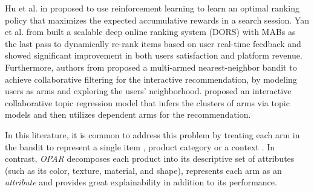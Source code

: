 \documentclass[11pt, dvipdfmx]{article}
\begin{document}
Hu et al. in \cite{KDD18_TaobaoSearch_RL} proposed to use reinforcement learning to learn an optimal ranking policy that maximizes the expected accumulative rewards in a search session. 
Yan et al. from \cite{MLKD19_JD_onlineRanking} built a scalable deep online ranking system (DORS) with MABs as the last pass to dynamically re-rank items based on user real-time feedback and showed significant improvement in both users satisfaction and platform revenue. 
Furthermore, authors from \cite{recsys19_interativeRecs} proposed a multi-armed nearest-neighbor bandit to achieve collaborative filtering for the interactive recommendation, by modeling users as arms and exploring the users' neighborhood. \cite{IEEE19_onlineInterativeCF} proposed an interactive collaborative topic regression model that infers the clusters of arms via topic models \cite{LDA} and then utilizes dependent arms for the recommendation. 

In this literature, it is common to address this problem by treating each arm in the bandit to represent a single item \cite{kdd20_sequentialRec}, product category \cite{MLKD19_JD_onlineRanking} or a context  \cite{KDD18_TaobaoSearch_RL,li2017contextaware,ICML16_contextCascadingBandits}. In contrast, \emph{OPAR} decomposes each product into its descriptive set of attributes (such as its color, texture, material, and shape), represents each arm as an \emph{attribute} and provides great explainability in addition to its performance. 

\end{document}
